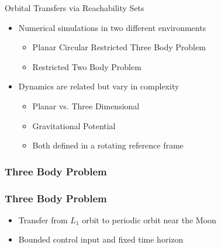 \begin{frame}[t]{Orbital Transfers via Reachability Sets}
    \begin{itemize}
        \item Numerical simulations in two different environments
        \begin{itemize}
            \item Planar Circular Restricted Three Body Problem
            \item Restricted Two Body Problem 
        \end{itemize}
        \pause
        \item Dynamics are related but vary in complexity
        \begin{itemize}
            \item Planar vs. Three Dimensional
            \item Gravitational Potential
            \item Both defined in a rotating reference frame
        \end{itemize}
    \end{itemize}

\end{frame}

\subsubsection[Circular Restricted Three Body Problem]{Three Body Problem}

\begin{frame}%
\frametitle{Three Body Problem}
    \begin{itemize}
        \item Transfer from \( L_1 \) orbit to periodic orbit near the Moon
        \item Bounded control input and fixed time horizon
    \end{itemize}
    
\end{frame} %

